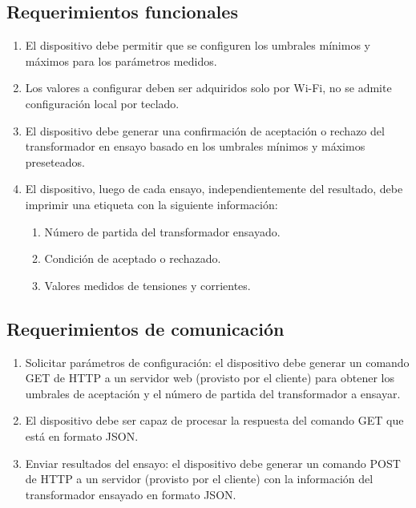 \subsection{Requerimientos funcionales}
	\begin{enumerate}
	\item El dispositivo debe permitir que se configuren los umbrales mínimos y máximos para los parámetros medidos. 
	\item Los valores a configurar deben ser adquiridos solo por Wi-Fi, no se admite configuración local por teclado.
	\item El dispositivo debe generar una confirmación de aceptación o rechazo del transformador en ensayo basado en los umbrales mínimos y máximos preseteados.
	\item El dispositivo, luego de cada ensayo, independientemente del resultado, debe imprimir una etiqueta con la siguiente información:
		\begin{enumerate}
		\item Número de partida del transformador ensayado.
		\item Condición de aceptado o rechazado.
		\item Valores medidos de tensiones y corrientes.
		\end{enumerate}
	\end{enumerate}	
\subsection{Requerimientos de comunicación}
	\begin{enumerate}
	\item Solicitar parámetros de configuración: el dispositivo debe generar un comando GET de HTTP a un servidor web (provisto por el cliente) para obtener los umbrales de aceptación y el número de partida del transformador a ensayar.
	\item El dispositivo debe ser capaz de procesar la respuesta del comando GET que está en formato JSON.
	\item Enviar resultados del ensayo: el dispositivo debe generar un comando POST de HTTP a un servidor (provisto por el cliente) con la información del transformador ensayado en formato JSON.
	\end{enumerate}
